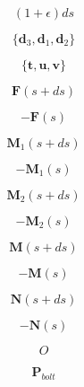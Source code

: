 \documentclass[a4paper,10pt,fleqn]{book}
\newcommand{\vect}[1]{\boldsymbol{#1}}
\begin{document}


\begin{equation}
(1+\epsilon) ds
\end{equation}


\begin{equation}
\{\vect{d}_3,\vect{d}_1,\vect{d}_2\}
\end{equation}


\begin{equation}
\{\vect{t},\vect{u},\vect{v}\}
\end{equation}


\begin{equation}
\vect{F}(s+ds)
\end{equation}


\begin{equation}
-\vect{F}(s)
\end{equation}


\begin{equation}
\vect{M}_{1}(s+ds)
\end{equation}


\begin{equation}
-\vect{M}_{1}(s)
\end{equation}


\begin{equation}
\vect{M}_{2}(s+ds)
\end{equation}


\begin{equation}
-\vect{M}_{2}(s)
\end{equation}


\begin{equation}
\vect{M}(s+ds)
\end{equation}


\begin{equation}
-\vect{M}(s)
\end{equation}


\begin{equation}
\vect{N}(s+ds)
\end{equation}


\begin{equation}
-\vect{N}(s)
\end{equation}


\begin{equation}
O
\end{equation}


\begin{equation}
\vect{P}_{bolt}
\end{equation}
\end{document}
